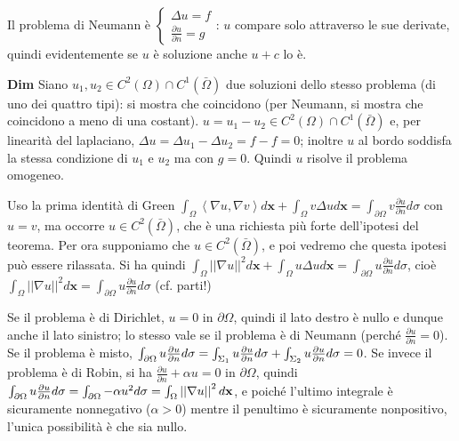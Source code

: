 \documentclass{article}
\begin{document}
Il problema di Neumann \`{e} $\left\{ 
\begin{array}{c}
\Delta u=f \\ 
\frac{\partial u}{\partial n}=g%
\end{array}%
\right. $: $u$ compare solo attraverso le sue derivate, quindi evidentemente
se $u$ \`{e} soluzione anche $u+c$ lo \`{e}.

\textbf{Dim} Siano $u_{1},u_{2}\in C^{2}\left( \Omega \right) \cap
C^{1}\left( \bar{\Omega}\right) $ due soluzioni dello stesso problema (di
uno dei quattro tipi): si mostra che coincidono (per Neumann, si mostra che
coincidono a meno di una costant). $u=u_{1}-u_{2}\in C^{2}\left( \Omega
\right) \cap C^{1}\left( \bar{\Omega}\right) $ e, per linearit\`{a} del
laplaciano, $\Delta u=\Delta u_{1}-\Delta u_{2}=f-f=0$; inoltre $u$ al bordo
soddisfa la stessa condizione di $u_{1}$ e $u_{2}$ ma con $g=0$. Quindi $u$
risolve il problema omogeneo.

Uso la prima identit\`{a} di Green $\int_{\Omega }\left\langle \nabla
u,\nabla v\right\rangle d\mathbf{x}+\int_{\Omega }v\Delta ud\mathbf{x}%
=\int_{\partial \Omega }v\frac{\partial u}{\partial n}d\sigma $ con $u=v$,
ma occorre $u\in C^{2}\left( \bar{\Omega}\right) $, che \`{e} una richiesta
pi\`{u} forte dell'ipotesi del teorema. Per ora supponiamo che $u\in
C^{2}\left( \bar{\Omega}\right) $, e poi vedremo che questa ipotesi pu\`{o}
essere rilassata. Si ha quindi $\int_{\Omega }\left\vert \left\vert \nabla
u\right\vert \right\vert ^{2}d\mathbf{x}+\int_{\Omega }u\Delta ud\mathbf{x}%
=\int_{\partial \Omega }u\frac{\partial u}{\partial n}d\sigma $, cio\`{e} $%
\int_{\Omega }\left\vert \left\vert \nabla u\right\vert \right\vert ^{2}d%
\mathbf{x}=\int_{\partial \Omega }u\frac{\partial u}{\partial n}d\sigma $
(cf. parti!)

Se il problema \`{e} di Dirichlet, $u=0$ in $\partial \Omega $, quindi il
lato destro \`{e} nullo e dunque anche il lato sinistro; lo stesso vale se
il problema \`{e} di Neumann (perch\'{e} $\frac{\partial u}{\partial n}=0$).
Se il problema \`{e} misto, $\int_{\partial \Omega }u\frac{\partial u}{%
\partial n}d\sigma =\int_{\Sigma _{1}}u\frac{\partial u}{\partial n}d\sigma
+\int_{\Sigma _{2}}u\frac{\partial u}{\partial n}d\sigma =0$. Se invece il
problema \`{e} di Robin, si ha $\frac{\partial u}{\partial n}+\alpha u=0$ in 
$\partial \Omega $, quindi $\int_{\partial \Omega }u\frac{\partial u}{%
\partial n}d\sigma =\int_{\partial \Omega }-\alpha u^{2}d\sigma
=\int_{\Omega }\left\vert \left\vert \nabla u\right\vert \right\vert ^{2}d%
\mathbf{x}$, e poich\'{e} l'ultimo integrale \`{e} sicuramente nonnegativo ($%
\alpha >0$) mentre il penultimo \`{e} sicuramente nonpositivo, l'unica
possibilit\`{a} \`{e} che sia nullo.
\end{document}
